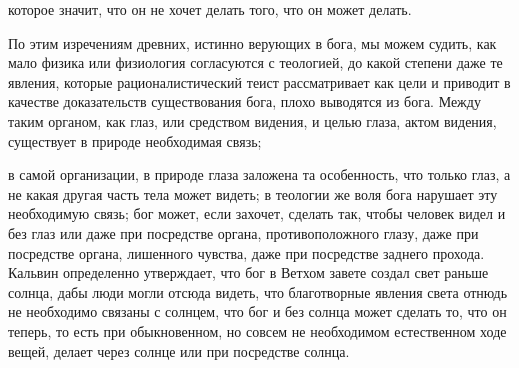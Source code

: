 \documentclass[12pt]{article}
\begin{document}
которое значит, что он не хочет делать того, что он может делать. 

По этим изречениям древних, истинно верующих в бога, мы можем судить, как мало физика или физиология согласуются с теологией, до какой степени даже те явления, которые рационалистический теист рассматривает как цели и приводит в качестве доказательств существования бога, плохо выводятся из бога. Между таким органом, как глаз, или средством видения, и целью глаза, актом видения, существует в природе необходимая связь; 

в самой организации, в природе глаза заложена та особенность, что только глаз, а не какая другая часть тела может видеть; в теологии же воля бога нарушает эту необходимую связь; бог может, если захочет, сделать так, чтобы человек видел и без глаз или даже при посредстве органа, противоположного глазу, даже при посредстве органа, лишенного чувства, даже при посредстве заднего прохода. Кальвин определенно утверждает, что бог в Ветхом завете создал свет раньше солнца, дабы люди могли отсюда видеть, что благотворные явления света отнюдь не необходимо связаны с солнцем, что бог и без солнца может сделать то, что он теперь, то есть при обыкновенном, но совсем не необходимом естественном ходе вещей, делает через солнце или при посредстве солнца. 
\end{document}
